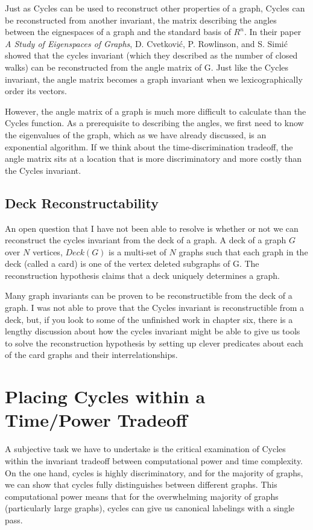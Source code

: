 Just as Cycles can be used to reconstruct other properties of a graph, Cycles can be reconstructed from another invariant, the matrix describing the angles between the eignespaces of a graph and the standard basis of $R^n$.
In their paper \emph{A Study of Eigenspaces of Graphs}, D. Cvetkovi\'c, P. Rowlinson, and S. Simi\'c showed that the cycles invariant (which they described as the number of closed walks) can be reconstructed from the angle matrix of G.
Just like the Cycles invariant, the angle matrix becomes a graph invariant when we lexicographically order its vectors.

However, the angle matrix of a graph is much more difficult to calculate than the Cycles function.
As a prerequisite to describing the angles, we first need to know the eigenvalues of the graph, which as we have already discussed, is an exponential algorithm.
If we think about the time-discrimination tradeoff, the angle matrix sits at a location that is more discriminatory and more costly than the Cycles invariant.

\subsection{Deck Reconstructability}

An open question that I have not been able to resolve is whether or not we can reconstruct the cycles invariant from the deck of a graph.
A deck of a graph $G$ over $N$ vertices, $Deck(G)$ is a multi-set of $N$ graphs such that each graph in the deck (called a card) is one of the vertex deleted subgraphs of G. 
The reconstruction hypothesis claims that a deck uniquely determines a graph.

Many graph invariants can be proven to be reconstructible from the deck of a graph.
I was not able to prove that the Cycles invariant is reconstructible from a deck, but, if you look to some of the unfinished work in chapter six, there is a lengthy discussion about how the cycles invariant might be able to give us tools to solve the reconstruction hypothesis by setting up clever predicates about each of the card graphs and their interrelationships.

\section{Placing Cycles within a Time/Power Tradeoff}
A subjective task we have to undertake is the critical examination of Cycles within the invariant tradeoff between computational power and time complexity.
On the one hand, cycles is highly discriminatory, and for the majority of graphs, we can show that cycles fully distinguishes between different graphs.
This computational power means that for the overwhelming majority of graphs (particularly large graphs), cycles can give us canonical labelings with a single pass.


